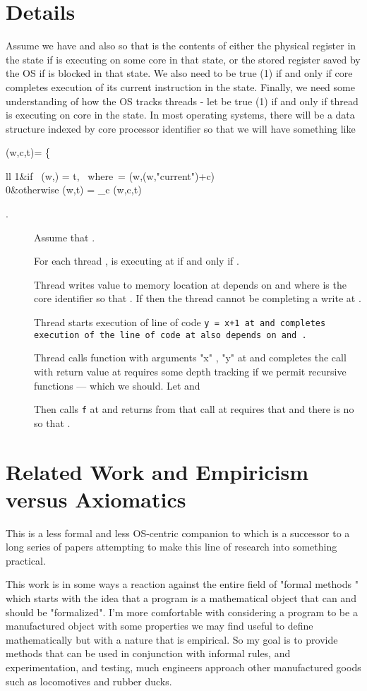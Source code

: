 \documentclass[english,11pt]{article}
\newcommand{\Word}{\mathrm{Word}}
\newcommand{\Active}{\mathrm{Active}}
\newcommand{\Bfunc}{\left\{\begin{array}{ll}}
\newcommand{\Efunc}{\end{array}\right.}
\newcommand{\Beq}{}
\begin{document}
\section{Details\label{sec:details}}
Assume we have  and also  so that  is the contents
of either the physical register  in the  state if  is executing on
some core in that state, or the stored register saved by the OS if  is blocked
in that state. We also need  to be true (1) if and only if core 
completes execution of its current instruction in the  state.  Finally, 
we need some understanding of how the OS tracks threads - let
 be true (1) if and only if thread  is executing
on core  in the  state. In most operating systems, there will be a 
data structure indexed by core processor identifier so that we will
have something like
\Beq
\Active(w,c,t)= \Bfunc
	1&\mbox{if } \Word(w,\beta) = t, \mbox{ where }\beta = \Word(w,\Word(w,"current")+c)\\
	0&\mbox{otherwise}
\Active(w,t) = \Sigma_c \Active(w,c,t)
\Efunc \Eeq

\begin{description}
\item[] Assume that .
\item[] For each thread ,  is executing  at  if and only if .
\item[] Thread  writes value  to memory location  at  depends
on   and  where  is the core
identifier so that . If  then the thread cannot
be completing a write at .
\item[] Thread  starts execution of line of code \tt{y = x+1} at  and 
completes execution of the line of code at  also depends on  and
. 
\item[] Thread  calls function  with arguments "x" , "y"  at  and completes the call with return value  at
 requires some depth tracking if we permit recursive functions --- which we should. Let  and 

Then  calls {\tt f} at  and returns from that call at  requires that
 and there is no  so that
.
\end{description}
\section{Related Work and Empiricism versus Axiomatics}

This is a less formal and less OS-centric companion to \cite{h2} which is a successor to a long series of papers attempting to
make this line of research into something practical. 

This work is in some ways a reaction against the entire field of "formal methods
" which starts with the idea that a program is a mathematical object that
can and should be "formalized". I'm more comfortable with considering a 
program to be a manufactured object with some properties we may find useful to define mathematically but with a nature that is empirical. So my goal is to 
provide methods that can be used in conjunction with  informal rules, and experimentation, and testing, much engineers approach other manufactured goods such as locomotives and rubber ducks.
\end{document}

